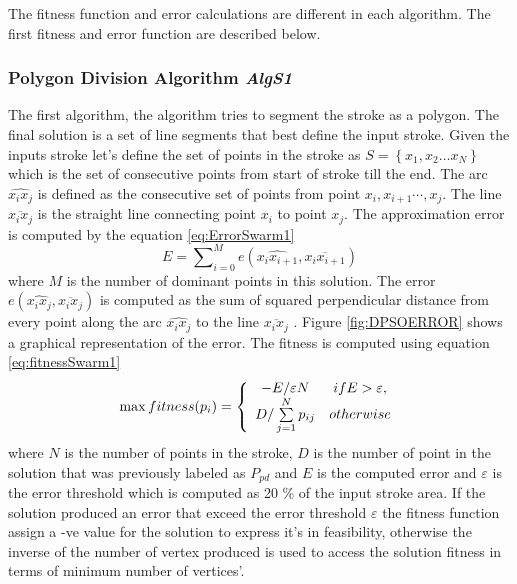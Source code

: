 The fitness function and error calculations are different in each algorithm. The first fitness and error function are described below. 

\subsubsection{Polygon Division Algorithm \textsl{AlgS1}}
\label{sec:PolygonDivisionAlgorithm}
The first algorithm, the algorithm tries to segment the stroke as a polygon. The final solution is a set of line segments that best define the input stroke. Given the inputs stroke let's define the set of points in the stroke as  $S = \left\{ {x_1 ,x_2  \ldots x_N } \right\}$ which is the set of consecutive points from start of stroke till the end. The arc $\widehat{x_ix_j}$ is defined as the consecutive set of points from point $x_i,x_{i+1} \cdots,x_j$. The line
$\overline{x_i x_j} $ is the straight line connecting point $x_i$ to point $x_j$. The approximation error is computed by the equation \ref{eq:ErrorSwarm1} 
\begin{equation}
E=\sum\nolimits_{i = 0}^M e ( \widehat{x_ix_{i+1}},\overline{x_i x_{i+1}})
\label{eq:ErrorSwarm1}
\end{equation}
 where $M$ is the number of dominant points in this solution.  The error $ e ( \widehat{x_ix_j},\overline{x_i x_j})$ is computed as the sum of squared perpendicular distance from every point along the arc $\widehat{x_ix_j}$ to the line $\overline{x_i x_j}$ \cite{PolygonApproximationPSO}. Figure \ref{fig:DPSOERROR} shows a graphical representation of the error. The fitness is computed using equation \ref{eq:fitnessSwarm1} 
\begin{equation}
\max fitness(p_i ) = \left\{ {\begin{array}{*{20}c}
   { - E/\varepsilon N} & {ifE > \varepsilon ,}  \\
   {D/\sum\limits_{j = 1}^N {p_{ij} } } & {otherwise}  \\
\end{array}} \right.
\label{eq:fitnessSwarm1}
\end{equation}%
where $N$ is the number of points in the stroke, $D$ is the number of point in the solution that was previously labeled as $P_{pd}$  and $E$ is the computed error and $\varepsilon$ is the error threshold which is computed as 20 \% of the input stroke area.  If the solution produced an error that exceed the error threshold $\varepsilon$ the fitness function assign a -ve value for the solution to express it's in feasibility, otherwise the inverse of the number of vertex produced is used to access the solution fitness in terms of minimum number of vertices'.   

